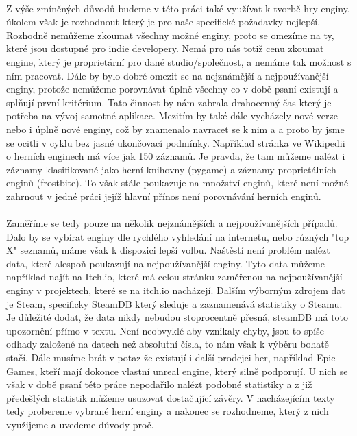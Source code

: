 \paragraph{}
	Z výše zmíněných důvodů budeme v této práci také využívat k tvorbě hry enginy, úkolem však je rozhodnout který je pro naše specifické požadavky nejlepší.
	Rozhodně nemůžeme zkoumat všechny možné enginy, proto se omezíme na ty, které jsou dostupné pro indie developery.
	Nemá pro nás totiž cenu zkoumat engine, který je proprietární pro dané studio/společnost, a nemáme tak možnost s ním pracovat.
	Dále by bylo dobré omezit se na nejznámější a nejpoužívanější enginy, protože nemůžeme porovnávat úplně všechny co v době psaní existují a splňují první kritérium.
	Tato činnost by nám zabrala drahocenný čas který je potřeba na vývoj samotné aplikace.
	Mezitím by také dále vycházely nové verze nebo i úplně nové enginy, což by znamenalo navracet se k nim a  a proto by jsme se ocitli v cyklu bez jasné ukončovací podmínky.
	Například stránka ve Wikipedii o herních enginech\cite{list_of_game_engines_wiki} má více jak 150 záznamů.
	Je pravda, že tam můžeme nalézt i záznamy klasifikované jako herní knihovny (pygame\cite{pygame}) a záznamy proprietálních enginů (frostbite\cite{frostbite}).
	To však stále poukazuje na množství enginů, které není možné zahrnout v jedné práci jejíž hlavní přínos není porovnávání herních enginů.

\paragraph{}
	Zaměříme se tedy pouze na několik nejznámějších a nejpoužívanějších případů.
	Dalo by se vybírat enginy dle rychlého vyhledání na internetu, nebo různých "top X" seznamů, máme však k dispozici lepší volbu.
	Naštěstí není problém nalézt data, které alespoň poukazují na nejpoužívanější enginy.
	Tyto data můžeme například najít na Itch.io\cite{itch_io_engines}, které má celou stránku zaměřenou na nejpoužívanější enginy v projektech, které se na itch.io nacházejí.
	Dalším výborným zdrojem dat je Steam, specificky SteamDB\cite{steamdb_engines} který sleduje a zaznamenává statistiky o Steamu.
	Je důležité dodat, že data nikdy nebudou stoprocentně přesná, steamDB má toto upozornění přímo v textu.
	Není neobvyklé aby vznikaly chyby, jsou to spíše odhady založené na datech než absolutní čísla, to nám však k výběru bohatě stačí.
	Dále musíme brát v potaz že existují i další prodejci her, například Epic Games, kteří mají dokonce vlastní unreal engine, který silně podporují.
	U nich se však v době psaní této práce nepodařilo nalézt podobné statistiky a z již předešlých statistik můžeme usuzovat dostačující závěry.
	V nacházejícím texty tedy probereme vybrané herní enginy a nakonec se rozhodneme, který z nich využijeme a uvedeme důvody proč.
	

